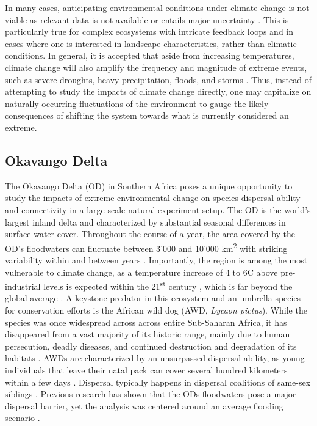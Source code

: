 \documentclass[abstract=on,10pt,a4paper,bibliography=totocnumbered]{article}
\begin{document}
In many cases, anticipating environmental conditions under climate change is not
viable as relevant data is not available or entails major uncertainty
\citep{Collins.2012}. This is particularly true for complex ecosystems with
intricate feedback loops and in cases where one is interested in landscape
characteristics, rather than climatic conditions. In general, it is accepted
that aside from increasing temperatures, climate change will also amplify the
frequency and magnitude of extreme events, such as severe droughts, heavy
precipitation, floods, and storms \citep{Stott.2016, Ummenhofer.2017,
 IPCC.2022}. Thus, instead of attempting to study the impacts of climate change
directly, one may capitalize on naturally occurring fluctuations of the
environment to gauge the likely consequences of shifting the system towards what
is currently considered an extreme.

\subsection{Okavango Delta}
The Okavango Delta (OD) in Southern Africa poses a unique opportunity to study
the impacts of extreme environmental change on species dispersal ability and
connectivity in a large scale natural experiment setup. The OD is the world's
largest inland delta and characterized by substantial seasonal differences in
surface-water cover. Throughout the course of a year, the area covered by the
OD's floodwaters can fluctuate between 3'000 and 10'000 km\textsuperscript{2}
with striking variability within and between years \citep{Gumbricht.2004,
 Wolski.2017}. Importantly, the region is among the most vulnerable to climate
change, as a temperature increase of 4 to 6\degree C above pre-industrial levels
is expected within the 21\textsuperscript{st} century \citep{Engelbrecht.2015,
 Akinyemi.2019}, which is far beyond the global average \citep{IPCC.2022}. A
keystone predator in this ecosystem and an umbrella species for conservation
efforts is the African wild dog (AWD, \textit{Lycaon pictus}). While the species
was once widespread across across entire Sub-Saharan Africa, it has disappeared
from a vast majority of its historic range, mainly due to human persecution,
deadly diseases, and continued destruction and degradation of its habitats
\citep{Woodroffe.2012}. AWDs are characterized by an unsurpassed dispersal
ability, as young individuals that leave their natal pack can cover several
hundred kilometers within a few days \citep{Davies-Mostert.2012, Masenga.2016,
 Cozzi.2020}. Dispersal typically happens in dispersal coalitions of same-sex
siblings  \citep{McNutt.1996}. Previous research has shown that the ODs
floodwaters pose a major dispersal barrier, yet the analysis was centered around
an average flooding scenario \citep{Hofmann.2021}.
\end{document}
